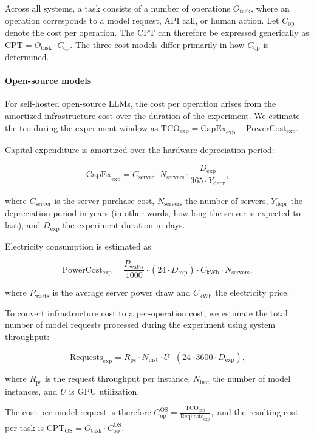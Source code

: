 Across all systems, a task consists of a number of operations $O_{\text{task}}$, where an operation corresponds to a model request, API call, or human action. Let $C_{\text{op}}$ denote the cost per operation. The CPT can therefore be expressed generically as $
\text{CPT} = O_{\text{task}} \cdot C_{\text{op}}
$. The three cost models differ primarily in how $C_{\text{op}}$ is determined.

\paragraph{Open-source models}

For self-hosted open-source LLMs, the cost per operation arises from the amortized infrastructure cost over the duration of the experiment. We estimate the \ac{tco} during the experiment window as $
\text{TCO}_{\text{exp}} = \text{CapEx}_{\text{exp}} + \text{PowerCost}_{\text{exp}}$.

Capital expenditure is amortized over the hardware depreciation period:

\[
\text{CapEx}_{\text{exp}} =	
C_{\text{server}} \cdot N_{\text{servers}}
\cdot
\frac{D_{\text{exp}}}{365 \cdot Y_{\text{depr}}},
\]

where $C_{\text{server}}$ is the server purchase cost, $N_{\text{servers}}$ the number of servers, $Y_{\text{depr}}$ the depreciation period in years (in other words, how long the server is expected to last), and $D_{\text{exp}}$ the experiment duration in days.

Electricity consumption is estimated as

\[
\text{PowerCost}_{\text{exp}} =
\frac{P_{\text{watts}}}{1000}
\cdot (24 \cdot D_{\text{exp}})
\cdot C_{\text{kWh}}
\cdot N_{\text{servers}},
\]

where $P_{\text{watts}}$ is the average server power draw and $C_{\text{kWh}}$ the electricity price.

To convert infrastructure cost to a per-operation cost, we estimate the total number of model requests processed during the experiment using system throughput:

\[
\text{Requests}_{\text{exp}} =
R_{\text{ps}} \cdot N_{\text{inst}} \cdot U
\cdot (24 \cdot 3600 \cdot D_{\text{exp}}),
\]

where $R_{\text{ps}}$ is the request throughput per instance, $N_{\text{inst}}$ the number of model instances, and $U$ is GPU utilization.

The cost per model request is therefore $
C_{\text{op}}^{\text{OS}} =
\frac{\text{TCO}_{\text{exp}}}{\text{Requests}_{\text{exp}}},
$ and the resulting cost per task is
$
\text{CPT}_{\text{OS}} =
O_{\text{task}} \cdot C_{\text{op}}^{\text{OS}} .
$

